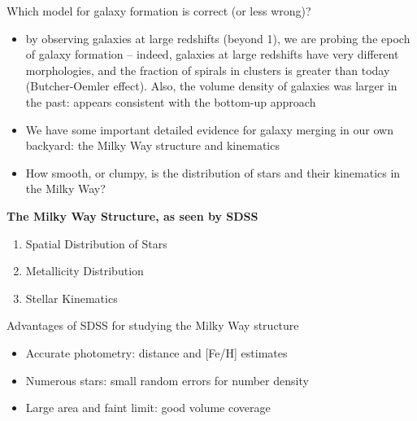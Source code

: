 \documentclass[letterpaper,landscape]{slides}
\begin{document}
\begin{slide}
\begin{center}
{\color{red}  Which model for galaxy formation is correct (or less wrong)?}
\end{center}
  
\begin{itemize}
\item by observing galaxies at large redshifts (beyond 1), we are probing 
      the epoch of galaxy formation -- indeed, {\color{blue}  galaxies at large redshifts
      have very different morphologies}, and the fraction of spirals in 
      clusters is greater than today (Butcher-Oemler effect). Also, {\color{blue}  the
      volume density of galaxies was larger in the past}: appears consistent with
      the bottom-up approach
\item {\color{red} We have some important detailed evidence for galaxy merging in our 
    own backyard:} the Milky Way structure and kinematics
\item {\color{blue} How smooth, or clumpy, is the distribution of stars and their kinematics
   in the Milky Way?}
\end{itemize}
\vfill
\end{slide}





\begin{slide}
\begin{center}
\bfseries
{\large {\color{blue} The Milky Way Structure,} as seen by SDSS}
\end{center}
\vskip -0.3in

\begin{enumerate}
             \item Spatial Distribution of Stars
             \item Metallicity Distribution
             \item Stellar Kinematics 
\end{enumerate}

{\color{red} Advantages of SDSS for studying the Milky Way structure}
   \begin{itemize}
   \item {\color{blue} Accurate photometry:} distance and [Fe/H] estimates
   \item {\color{blue} Numerous stars:} small random errors for number density
   \item {\color{blue} Large area and faint limit}: good volume coverage 
   \end{itemize}

\vfill
\end{slide}
 
\end{document}
